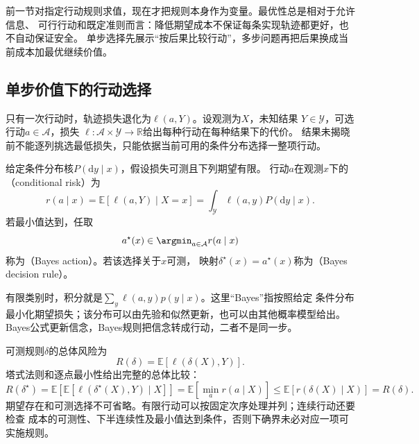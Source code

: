 前一节对指定行动规则求值，现在才把规则本身作为变量。最优性总是相对于允许信息、
可行行动和既定准则而言：降低期望成本不保证每条实现轨迹都更好，也不自动保证安全。
单步选择先展示“按后果比较行动”，多步问题再把后果换成当前成本加最优继续价值。

\subsection{单步价值下的行动选择}
\label{sec:decision-bayes-rules}

只有一次行动时，轨迹损失退化为$\ell(a,Y)$。设观测为$X$，未知结果
$Y\in\mathcal Y$，可选行动$a\in\mathcal A$，损失
$\ell:\mathcal A\times\mathcal Y\to\mathbb R$给出每种行动在每种结果下的代价。
结果未揭晓前不能逐列挑选最低损失，只能依据当前可用的条件分布选择一整项行动。

\begin{definition}[条件风险与Bayes决策]
\label{def:decision-conditional-risk-bayes-rule}
给定条件分布核$P(\mathrm dy\mid x)$，假设损失可测且下列期望有限。
行动$a$在观测$x$下的（conditional risk）为
\begin{equation}
  r(a\mid x)=\mathbb E[\ell(a,Y)\mid X=x]
  =\int_{\mathcal Y}\ell(a,y)P(\mathrm dy\mid x).
  \label{eq:decision-conditional-risk}
\end{equation}
若最小值达到，任取
\begin{equation}
  a^\star(x)\in\argmin_{a\in\mathcal A}r(a\mid x)
  \label{eq:decision-bayes-action}
\end{equation}
称为（Bayes action）。若该选择关于$x$可测，
映射$\delta^\star(x)=a^\star(x)$称为（Bayes decision rule）。
\end{definition}
有限类别时，积分就是$\sum_y\ell(a,y)p(y\mid x)$。这里“Bayes”指按照给定
条件分布最小化期望损失；该分布可以由先验和似然更新，也可以由其他概率模型给出。
Bayes公式更新信念，Bayes规则把信念转成行动，二者不是同一步。

可测规则$\delta$的总体风险为
\begin{equation}
  R(\delta)=\mathbb E[\ell(\delta(X),Y)].
  \label{eq:decision-rule-risk}
\end{equation}
塔式法则和逐点最小性给出完整的总体比较：
\[
  R(\delta^\star)
  =\mathbb E\!\left[\mathbb E[\ell(\delta^\star(X),Y)\mid X]\right]
  =\mathbb E[\min_a r(a\mid X)]
  \leq\mathbb E[r(\delta(X)\mid X)]
  =R(\delta).
\]
期望存在和可测选择不可省略。有限行动可以按固定次序处理并列；连续行动还要检查
成本的可测性、下半连续性及最小值达到条件，否则下确界未必对应一项可实施规则。

